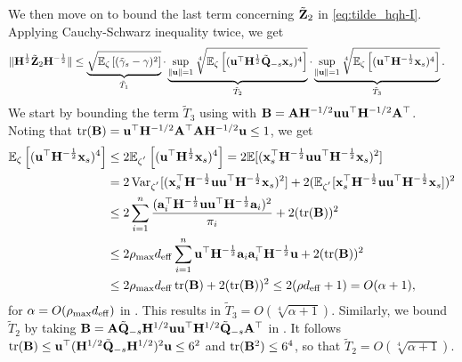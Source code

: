 \documentclass[11pt,a4paper]{article}
\begin{document}
We then move on to bound the last term concerning $\tilde{\mathbf{Z}}_2$ in \eqref{eq:tilde_hqh-I}. 
Applying Cauchy-Schwarz inequality twice, we get
\begin{align}
    \|\mathbf{H}^{\frac{1}{2}}\tilde{\mathbf{Z}}_2\mathbf{H}^{-\frac{1}{2}}\| &\leq \underbrace{\sqrt{{\mathbb{E}}_{\zeta} \left[(\tilde\gamma_s-\gamma)^2  \right]}}_{\tilde  T_1} \cdot \underbrace{ \sup\limits_{\|\mathbf{u}\|=1}\sqrt[4]{{\mathbb{E}}_{\zeta} \left[(\mathbf{u}^\top \mathbf{H}^{\frac{1}{2}}\tilde {\mathbf{Q}}_{-s}\mathbf{x}_s)^4\right]} }_{\tilde  T_2}\cdot \underbrace{ \sup\limits_{\|\mathbf{u}\|=1}\sqrt[4]{{\mathbb{E}}_{\zeta} \left[(\mathbf{u}^\top \mathbf{H}^{-\frac{1}{2}}\mathbf{x}_s)^4\right]} }_{\tilde  T_3}.\label{eq:tilde_z_2}
\end{align}
We start by bounding the term $\tilde T_3$ using  with $\mathbf{B}=\mathbf{A}\mathbf{H}^{-1/2}\mathbf{u}\mathbf{u}^\top\mathbf{H}^{-1/2}\mathbf{A}^\top$. Noting that  $\operatorname{tr}(\mathbf{B})=\mathbf{u}^\top\mathbf{H}^{-1/2}\mathbf{A}^\top\mathbf{A}\mathbf{H}^{-1/2}\mathbf{u} \leq 1$, we get
\begin{align}
    {\mathbb{E}}_{\zeta} \left[(\mathbf{u}^\top \mathbf{H}^{-\frac{1}{2}}\mathbf{x}_s)^4\right]&\leq 2 {\mathbb{E}}_{\zeta^{'}} \left[(\mathbf{u}^\top \mathbf{H}^{\frac{1}{2}}\mathbf{x}_s)^4\right]=2{\mathbb{E}}[(\mathbf{x}_s^\top\mathbf{H}^{-\frac{1}{2}}\mathbf{u}\mathbf{u}^\top\mathbf{H}^{-\frac{1}{2}}\mathbf{x}_s)^2] \nonumber\\
    &=2 \operatorname{Var}_{\zeta^{'}}[(\mathbf{x}_s^\top\mathbf{H}^{-\frac{1}{2}}\mathbf{u}\mathbf{u}^\top\mathbf{H}^{-\frac{1}{2}}\mathbf{x}_s)^2]+2( {\mathbb{E}}_{\zeta^{'}} [\mathbf{x}_s^\top\mathbf{H}^{-\frac{1}{2}}\mathbf{u}\mathbf{u}^\top\mathbf{H}^{-\frac{1}{2}}\mathbf{x}_s])^2\nonumber\\
    &\leq 2\sum^n_{i=1}\frac{(\mathbf{a}_i^\top\mathbf{H}^{-\frac{1}{2}}\mathbf{u}\mathbf{u}^\top\mathbf{H}^{-\frac{1}{2}}\mathbf{a}_i)^2}{\pi_i}+2(\operatorname{tr}(\mathbf{B}))^2\nonumber\\
    &\leq 2 \rho_{\max} d_{\mathrm{eff}}\sum^n_{i=1}\mathbf{u}^\top\mathbf{H}^{-\frac{1}{2}}\mathbf{a}_i\mathbf{a}_i^\top\mathbf{H}^{-\frac{1}{2}}\mathbf{u}+2(\operatorname{tr}(\mathbf{B}))^2\nonumber\\
    &\leq 2 \rho_{\max} d_{\mathrm{eff}}\operatorname{tr}(\mathbf{B})+2(\operatorname{tr}(\mathbf{B}))^2\leq 2(\rho d_{\mathrm{eff}}+1) = O(\alpha+1), \nonumber
\end{align}
for $\alpha=O(\rho_{\max} d_{\mathrm{eff}})$ in .
This results in $\tilde T_3=O(\sqrt[4]{\alpha+1})$.  
Similarly, we bound $\tilde T_2$ by taking $\mathbf{B}=\mathbf{A}\tilde {\mathbf{Q}}_{-s}\mathbf{H}^{1/2}\mathbf{u}\mathbf{u}^\top\mathbf{H}^{1/2}\tilde {\mathbf{Q}}_{-s}\mathbf{A}^\top$ in . 
It follows $\operatorname{tr}(\mathbf{B})\leq \mathbf{u}^\top (\mathbf{H}^{1/2}\tilde {\mathbf{Q}}_{-s}\mathbf{H}^{1/2})^2 \mathbf{u} \leq 6^2$ and $\operatorname{tr}(\mathbf{B}^2)\leq 6^4$, so that $\tilde T_2=O(\sqrt[4]{\alpha+1})$. 
\end{document}
